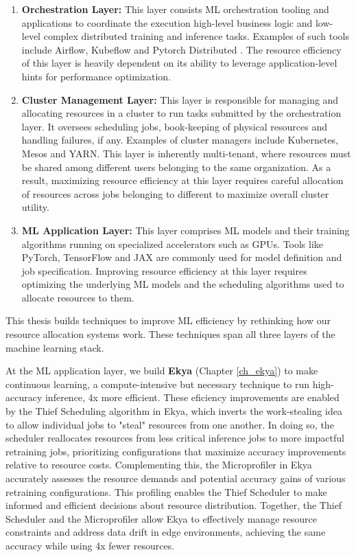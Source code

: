 \begin{enumerate}
    \item \textbf{Orchestration Layer:} This layer consists ML orchestration tooling and applications to coordinate the execution high-level business logic and low-level complex distributed training and inference tasks. Examples of such tools include Airflow\cite{airflow}, Kubeflow\cite{kubeflow} and Pytorch Distributed \cite{pytorch}. The resource efficiency of this layer is heavily dependent on its ability to leverage application-level hints for performance optimization. 
    
    \item \textbf{Cluster Management Layer:} This layer is responsible for managing and allocating resources in a cluster to run tasks submitted by the orchestration layer. It oversees scheduling jobs, book-keeping of physical resources and handling failures, if any. Examples of cluster managers include Kubernetes\cite{kubernetes}, Mesos\cite{mesos} and YARN\cite{yarn}. This layer is inherently multi-tenant, where resources must be shared among different users belonging to the same organization. As a result, maximizing resource efficiency at this layer requires careful allocation of resources across jobs belonging to different to maximize overall cluster utility.   
    
    \item \textbf{ML Application Layer:} This layer comprises ML models and their training algorithms running on specialized accelerators such as GPUs. Tools like PyTorch\cite{pytorch}, TensorFlow\cite{tensorflow} and JAX\cite{jax2018github} are commonly used for model definition and job specification. Improving resource efficiency at this layer requires optimizing the underlying ML models and the scheduling algorithms used to allocate resources to them.
\end{enumerate}

This thesis builds techniques to improve ML efficiency by rethinking how our resource allocation systems work. These techniques span all three layers of the machine learning stack.

At the ML application layer, we build \textbf{Ekya} (Chapter \ref{ch_ekya}) to make continuous learning, a compute-intensive but necessary technique to run high-accuracy inference, 4x more efficient. These eficiency improvements are enabled by the Thief Scheduling algorithm in Ekya, which inverts the work-stealing idea \cite{workstealing} to allow individual jobs to "steal" resources from one another. In doing so, the scheduler reallocates resources from less critical inference jobs to more impactful retraining jobs, prioritizing configurations that maximize accuracy improvements relative to resource costs. Complementing this, the Microprofiler in Ekya accurately assesses the resource demands and potential accuracy gains of various retraining configurations. This profiling enables the Thief Scheduler to make informed and efficient decisions about resource distribution. Together, the Thief Scheduler and the Microprofiler allow Ekya to effectively manage resource constraints and address data drift in edge environments, achieving the same accuracy while using 4x fewer resources.

